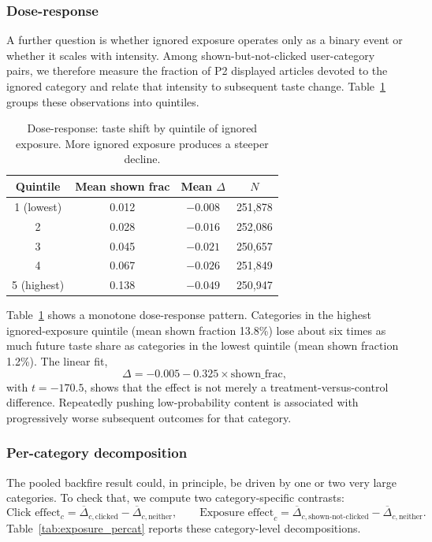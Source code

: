 \documentclass[11pt]{article}
\begin{document}
\subsubsection{Dose-response}

A further question is whether ignored exposure operates only as a binary event or whether it scales with intensity. Among shown-but-not-clicked user-category pairs, we therefore measure the fraction of P2 displayed articles devoted to the ignored category and relate that intensity to subsequent taste change. Table~\ref{tab:doseresponse} groups these observations into quintiles.

\begin{table}[ht]
\centering
\caption{Dose-response: taste shift by quintile of ignored exposure. More ignored exposure produces a steeper decline.}
\label{tab:doseresponse}
\begin{tabular}{cccc}
\toprule
Quintile & Mean shown frac & Mean $\Delta$ & $N$ \\
\midrule
1 (lowest) & 0.012 & $-0.008$ & 251,878 \\
2 & 0.028 & $-0.016$ & 252,086 \\
3 & 0.045 & $-0.021$ & 250,657 \\
4 & 0.067 & $-0.026$ & 251,849 \\
5 (highest) & 0.138 & $\mathbf{-0.049}$ & 250,947 \\
\bottomrule
\end{tabular}
\end{table}
\FloatBarrier

Table~\ref{tab:doseresponse} shows a monotone dose-response pattern. Categories in the highest ignored-exposure quintile (mean shown fraction 13.8\%) lose about six times as much future taste share as categories in the lowest quintile (mean shown fraction 1.2\%). The linear fit,
\[
\Delta = -0.005 - 0.325 \times \text{shown\_frac},
\]
with $t=-170.5$, shows that the effect is not merely a treatment-versus-control difference. Repeatedly pushing low-probability content is associated with progressively worse subsequent outcomes for that category.

\subsubsection{Per-category decomposition}

The pooled backfire result could, in principle, be driven by one or two very large categories. To check that, we compute two category-specific contrasts:
\[
\text{Click effect}_c
=
\overline{\Delta}_{c,\text{clicked}}
-
\overline{\Delta}_{c,\text{neither}},
\qquad
\text{Exposure effect}_c
=
\overline{\Delta}_{c,\text{shown-not-clicked}}
-
\overline{\Delta}_{c,\text{neither}}.
\]
Table~\ref{tab:exposure_percat} reports these category-level decompositions.
\end{document}
